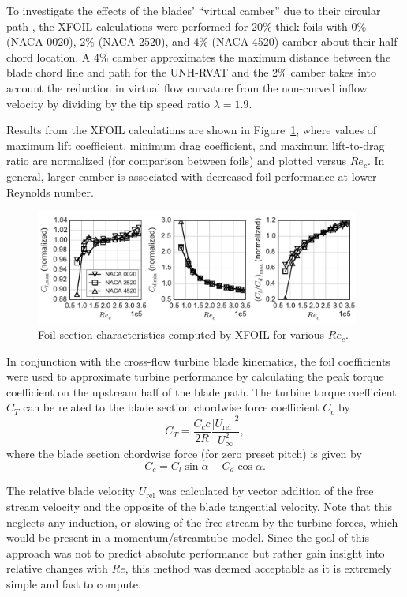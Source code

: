 \documentclass[energies,article,accept,moreauthors,pdftex,12pt,a4paper]{mdpi}
\begin{document}
To investigate the effects of the blades' ``virtual camber'' due to their
circular path \cite{Migliore1980}, the XFOIL calculations were performed for
20\% thick foils with 0\% (NACA 0020), 2\% (NACA 2520), and 4\% (NACA 4520)
camber about their half-chord location. A 4\% camber approximates the maximum
distance between the blade chord line and path for the UNH-RVAT and the 2\%
camber takes into account the reduction in virtual flow curvature from the
non-curved inflow velocity by dividing by the tip speed ratio $\lambda=1.9$.

Results from the XFOIL calculations are shown in Figure~\ref{fig:foil-Re-dep},
where values of maximum lift coefficient, minimum drag coefficient, and maximum
lift-to-drag ratio are normalized (for comparison between foils) and plotted
versus $Re_c$. In general, larger camber is associated with decreased foil
performance at lower Reynolds number.

\begin{figure}[ht!]
\centering
\includegraphics[width=0.95\textwidth]{figures/all_foils_re_dep}
\caption{Foil section characteristics computed by XFOIL for various $Re_c$.}
\label{fig:foil-Re-dep}
\end{figure}

In conjunction with the cross-flow turbine blade kinematics, the foil
coefficients were used to approximate turbine performance by calculating the
peak torque coefficient on the upstream half of the blade path. The turbine
torque coefficient $C_T$ can be related to the blade section chordwise force
coefficient $C_c$ by
\begin{equation}
C_T = \frac{C_c c}{2R} \frac{|U_\mathrm{rel}|^2}{U_\infty^2},
\end{equation}
where the blade section chordwise force (for zero preset pitch) is given by
\begin{equation}
C_c = C_l \sin \alpha - C_d \cos \alpha.
\end{equation}

The relative blade velocity $U_\mathrm{rel}$ was calculated by vector addition 
of the free 
stream velocity and the opposite of the blade tangential velocity. Note that 
this 
neglects any induction, or slowing of the free stream by the turbine forces, 
which would be present in a momentum/streamtube model. Since the goal of this 
approach was not to predict absolute performance but rather gain insight into 
relative changes with $Re$, 
this method was deemed acceptable as it is extremely simple and fast to 
compute. 
\end{document}
